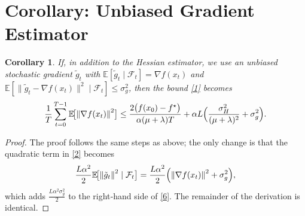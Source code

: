 \documentclass{article}
\newtheorem{corollary}{Corollary}
\newcommand{\E}{\mathbb{E}}
\newcommand{\norm}[1]{\left\lVert #1 \right\rVert}
\begin{document}
\section*{Corollary: Unbiased Gradient Estimator}
\begin{corollary}\label{cor:grad}
If, in addition to the Hessian estimator, we use an unbiased stochastic gradient $\tilde g_{t}$ with $\E[\tilde g_{t}\mid\mathcal{F}_{t}]=\nabla f(x_{t})$ and $\E[\|\tilde g_{t}-\nabla f(x_{t})\|^{2}\mid\mathcal{F}_{t}]\le\sigma_{g}^{2}$, then the bound \eqref{1} becomes
\[
\frac{1}{T}\sum_{t=0}^{T-1}\E\!\bigl[\norm{\nabla f(x_{t})}^{2}\bigr]
\le
\frac{2\bigl(f(x_{0})-f^{\star}\bigr)}{\alpha(\mu+\lambda)T}
+\alpha L\Bigl(\frac{\sigma_{H}^{2}}{(\mu+\lambda)^{2}}+\sigma_{g}^{2}\Bigr).
\]
\end{corollary}
\begin{proof}
The proof follows the same steps as above; the only change is that the quadratic term in \eqref{2} becomes
\[
\frac{L\alpha^{2}}{2}\E\!\bigl[\norm{\tilde g_{t}}^{2}\mid\mathcal{F}_{t}\bigr]
=\frac{L\alpha^{2}}{2}\Bigl(\norm{\nabla f(x_{t})}^{2}+\sigma_{g}^{2}\Bigr),
\]
which adds $\frac{L\alpha^{2}\sigma_{g}^{2}}{2}$ to the right‑hand side of \eqref{6}.  The remainder of the derivation is identical. \hfill\qedsymbol
\end{proof}

\end{document}
